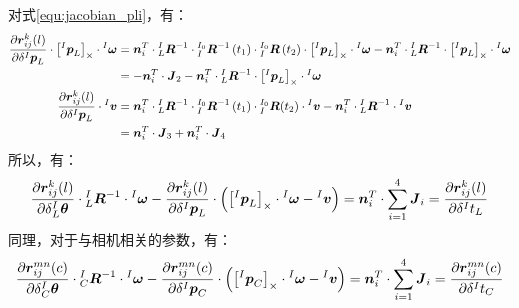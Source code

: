 对式\ref{equ:jacobian_pli}，有：
\begin{equation}
  \begin{aligned}
    \frac{\partial \boldsymbol{r}_{ij}^k(l)}{\partial \delta {^{I}\boldsymbol{p}_L}}
    \cdot\left[ {^{I}\boldsymbol{p}_L} \right]_\times\cdot{^{I}\boldsymbol{\omega}} & =
    \boldsymbol{n}_i^T\cdot
    {{^{I}_{L}}\boldsymbol{R}^{-1}}\cdot{{^{I_0}_{I}}\boldsymbol{R}^{-1}
      \left( t_1\right) }\cdot{{^{I_0}_{I}}\boldsymbol{R}\left( t_2\right) }
    \cdot\left[ {^{I}\boldsymbol{p}_L} \right]_\times
    \cdot{^{I}\boldsymbol{\omega}}
    -\boldsymbol{n}_i^T\cdot
    {{^{I}_{L}}\boldsymbol{R}^{-1}}\cdot\left[ {^{I}\boldsymbol{p}_L} \right]_\times\cdot{^{I}\boldsymbol{\omega}}
    \\&=-\boldsymbol{n}_i^T\cdot\boldsymbol{J}_2-
    \boldsymbol{n}_i^T\cdot
    {{^{I}_{L}}\boldsymbol{R}^{-1}}\cdot\left[ {^{I}\boldsymbol{p}_L} \right]_\times\cdot{^{I}\boldsymbol{\omega}}
    \\
    \frac{\partial \boldsymbol{r}_{ij}^k(l)}{\partial \delta {^{I}\boldsymbol{p}_L}}
    \cdot{^{I}\boldsymbol{v}}                                          & =
    \boldsymbol{n}_i^T\cdot{{^{I}_{L}}\boldsymbol{R}^{-1}}
    \cdot{{^{I_0}_{I}}\boldsymbol{R}^{-1}\left( t_1\right) }
    \cdot{^{I_0}_{I}\boldsymbol{R}}(t_2)\cdot{^{I}\boldsymbol{v}}
    -\boldsymbol{n}_i^T\cdot{{^{I}_{L}}\boldsymbol{R}^{-1}}\cdot{^{I}\boldsymbol{v}} \\&=
    \boldsymbol{n}_i^T\cdot\boldsymbol{J}_3+\boldsymbol{n}_i^T\cdot\boldsymbol{J}_4
  \end{aligned}
\end{equation}
所以，有：
\begin{equation}
  \frac{\partial \boldsymbol{r}_{ij}^k(l)}{\partial \delta {^{I}_{L}\boldsymbol{\theta}}}
  \cdot{{^{I}_{L}}\boldsymbol{R}^{-1}}\cdot{^{I}\boldsymbol{\omega}}-
  \frac{\partial \boldsymbol{r}_{ij}^k(l)}{\partial \delta {^{I}\boldsymbol{p}_L}}
  \cdot
  \left(
  \left[ {^{I}\boldsymbol{p}_L} \right]_\times\cdot{^{I}\boldsymbol{\omega}}-{^{I}\boldsymbol{v}}
  \right) =
  \boldsymbol{n}_i^T\cdot\sum_{i=1}^{4}\boldsymbol{J}_i=
  \frac{\partial \boldsymbol{r}_{ij}^k(l)}{\partial \delta {^{I}t_{L}}}
\end{equation}
同理，对于与相机相关的参数，有：
\begin{equation}
  \frac{\partial \boldsymbol{r}_{ij}^{mn}(c)}{\partial \delta {^{I}_{C}\boldsymbol{\theta}}}
  \cdot{{^{I}_{C}}\boldsymbol{R}^{-1}}\cdot{^{I}\boldsymbol{\omega}}-
  \frac{\partial \boldsymbol{r}_{ij}^{mn}(c)}{\partial \delta {^{I}\boldsymbol{p}_C}}
  \cdot
  \left(
  \left[ {^{I}\boldsymbol{p}_C} \right]_\times\cdot{^{I}\boldsymbol{\omega}}-{^{I}\boldsymbol{v}}
  \right) =
  \boldsymbol{n}_i^T\cdot\sum_{i=1}^{4}\boldsymbol{J}_i=
  \frac{\partial \boldsymbol{r}_{ij}^{mn}(c)}{\partial \delta {^{I}t_{C}}}
\end{equation}
